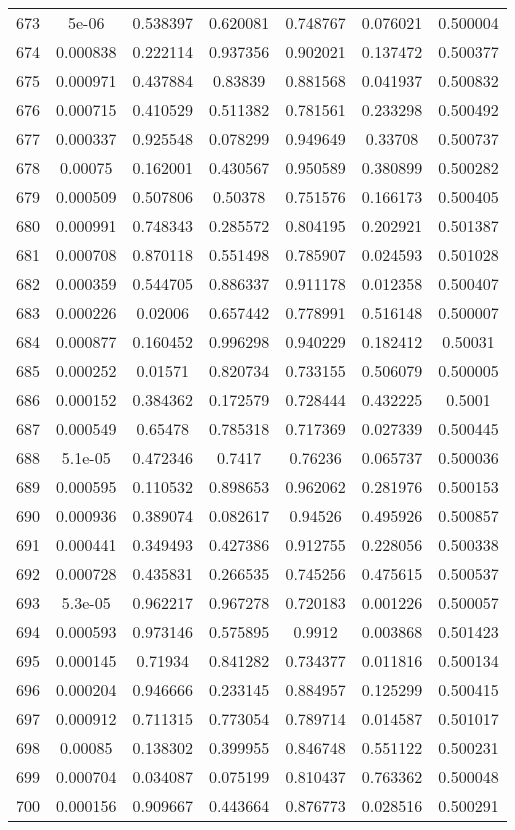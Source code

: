 \begin{table}
\begin{tabular}{c|c|c|c|c|c|c}
673 & 5e-06 & 0.538397 & 0.620081 & 0.748767 & 0.076021 & 0.500004\\
674 & 0.000838 & 0.222114 & 0.937356 & 0.902021 & 0.137472 & 0.500377\\
675 & 0.000971 & 0.437884 & 0.83839 & 0.881568 & 0.041937 & 0.500832\\
676 & 0.000715 & 0.410529 & 0.511382 & 0.781561 & 0.233298 & 0.500492\\
677 & 0.000337 & 0.925548 & 0.078299 & 0.949649 & 0.33708 & 0.500737\\
678 & 0.00075 & 0.162001 & 0.430567 & 0.950589 & 0.380899 & 0.500282\\
679 & 0.000509 & 0.507806 & 0.50378 & 0.751576 & 0.166173 & 0.500405\\
680 & 0.000991 & 0.748343 & 0.285572 & 0.804195 & 0.202921 & 0.501387\\
681 & 0.000708 & 0.870118 & 0.551498 & 0.785907 & 0.024593 & 0.501028\\
682 & 0.000359 & 0.544705 & 0.886337 & 0.911178 & 0.012358 & 0.500407\\
683 & 0.000226 & 0.02006 & 0.657442 & 0.778991 & 0.516148 & 0.500007\\
684 & 0.000877 & 0.160452 & 0.996298 & 0.940229 & 0.182412 & 0.50031\\
685 & 0.000252 & 0.01571 & 0.820734 & 0.733155 & 0.506079 & 0.500005\\
686 & 0.000152 & 0.384362 & 0.172579 & 0.728444 & 0.432225 & 0.5001\\
687 & 0.000549 & 0.65478 & 0.785318 & 0.717369 & 0.027339 & 0.500445\\
688 & 5.1e-05 & 0.472346 & 0.7417 & 0.76236 & 0.065737 & 0.500036\\
689 & 0.000595 & 0.110532 & 0.898653 & 0.962062 & 0.281976 & 0.500153\\
690 & 0.000936 & 0.389074 & 0.082617 & 0.94526 & 0.495926 & 0.500857\\
691 & 0.000441 & 0.349493 & 0.427386 & 0.912755 & 0.228056 & 0.500338\\
692 & 0.000728 & 0.435831 & 0.266535 & 0.745256 & 0.475615 & 0.500537\\
693 & 5.3e-05 & 0.962217 & 0.967278 & 0.720183 & 0.001226 & 0.500057\\
694 & 0.000593 & 0.973146 & 0.575895 & 0.9912 & 0.003868 & 0.501423\\
695 & 0.000145 & 0.71934 & 0.841282 & 0.734377 & 0.011816 & 0.500134\\
696 & 0.000204 & 0.946666 & 0.233145 & 0.884957 & 0.125299 & 0.500415\\
697 & 0.000912 & 0.711315 & 0.773054 & 0.789714 & 0.014587 & 0.501017\\
698 & 0.00085 & 0.138302 & 0.399955 & 0.846748 & 0.551122 & 0.500231\\
699 & 0.000704 & 0.034087 & 0.075199 & 0.810437 & 0.763362 & 0.500048\\
700 & 0.000156 & 0.909667 & 0.443664 & 0.876773 & 0.028516 & 0.500291\\
\end{tabular}
\end{table}

